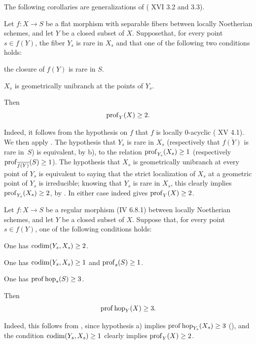 The following corollaries are generalizations of ( XVI 3.2 and 3.3).

\begin{corollaire} \label{XIV.1.19}
Let $f:X\to S$ be a flat morphism with separable fibers between locally Noetherian schemes, and let $Y$ be a closed subset of $X$. Suppose\pageoriginale that, for every point $s\in f(Y)$, the fiber $Y_s$ is rare in $X_s$ and that one of the following two conditions holds:
\begin{enumeratea}
\item
the closure of $f(Y)$ is rare in $S$.
\item
$X_s$ is geometrically unibranch at the points of $Y_s$.
\par\noindent
Then
$$
\operatorname{prof}_Y(X)\geq 2.
$$
\end{enumeratea}
\end{corollaire}

Indeed, it follows from the hypothesis on $f$ that $f$ is locally $0$-acyclic ( XV 4.1). We then apply . The hypothesis that $Y_s$ is rare in $X_s$ (respectively that $\overline{f(Y)}$ is rare in~$S$) is equivalent, by  b), to the relation $\operatorname{prof}_{Y_s}(X_s)\geq 1$ (respectively $\operatorname{prof}_{\overline{f(Y)}}(S)\geq 1$). The hypothesis that $X_s$ is geometrically unibranch at every point of $Y_s$ is equivalent to saying that the strict localization of $X_s$ at a geometric point of $Y_s$ is irreducible; knowing that $Y_s$ is rare in $X_s$, this clearly implies $\operatorname{prof}_{Y_s}(X_s)\geq 2$, by . In either case  indeed gives $\operatorname{prof}_Y(X)\geq 2$.

\begin{corollaire} \label{XIV.1.20}
Let $f:X\to S$ be a regular morphism (\textup{\EGA IV 6.8.1}) between locally Noetherian schemes, and let $Y$ be a closed subset of $X$. Suppose that, for every point $s\in f(Y)$, one of the following conditions holds:
\begin{enumeratea}
\item
One has $\operatorname{codim}(Y_s, X_s)\geq 2$.
\item
One has $\operatorname{codim}(Y_s, X_s)\geq 1$ and $\operatorname{prof}_s(S)\geq 1$.
\item
One has $\operatorname{prof}\operatorname{hop}_s(S)\geq 3$.
\end{enumeratea}
\noindent
Then\pageoriginale
$$
\operatorname{prof}\operatorname{hop}_Y(X)\geq 3.
$$
\end{corollaire}

Indeed, this follows from , since hypothesis a) implies $\operatorname{prof}\operatorname{hop}_{Y_s}(X_s)\geq 3$ (\cf {}), and the condition $\operatorname{codim}(Y_s, X_s)\geq 1$ clearly implies $\operatorname{prof}_Y(X)\geq 2$.

